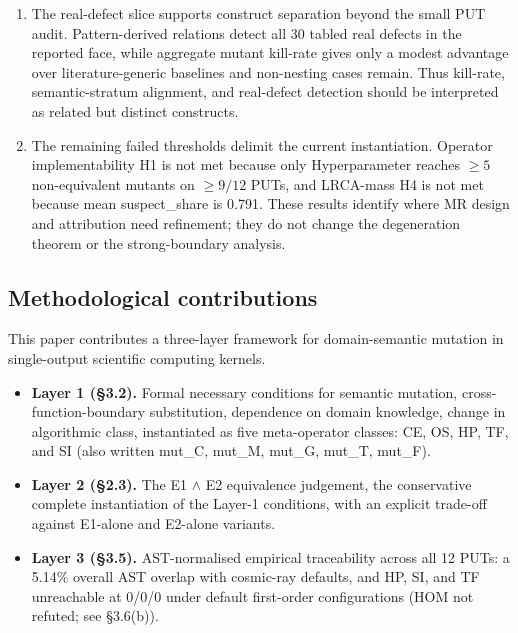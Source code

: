 \documentclass[acmsmall,screen,review]{acmart}
\providecommand{\tightlist}{\setlength{\itemsep}{0pt}\setlength{\parskip}{0pt}}
\begin{document}
\begin{enumerate}
  and Pattern Coverage is 0.163 at \(n = 12\), so orthogonality remains
  a future hypothesis.
\item
  The real-defect slice supports construct separation beyond the small
  PUT audit. Pattern-derived relations detect all 30 tabled real defects
  in the reported face, while aggregate mutant kill-rate gives only a
  modest advantage over literature-generic baselines and non-nesting
  cases remain. Thus kill-rate, semantic-stratum alignment, and
  real-defect detection should be interpreted as related but distinct
  constructs.
\item
  The remaining failed thresholds delimit the current instantiation.
  Operator implementability H1 is not met because only Hyperparameter
  reaches \(\geq 5\) non-equivalent mutants on \(\geq 9/12\) PUTs, and
  LRCA-mass H4 is not met because mean suspect\_share is 0.791. These
  results identify where MR design and attribution need refinement; they
  do not change the degeneration theorem or the strong-boundary
  analysis.
\end{enumerate}

\subsection{Methodological contributions}\label{methodological-contributions}

This paper contributes a three-layer framework for domain-semantic
mutation in single-output scientific computing kernels.

\begin{itemize}
\tightlist
\item
  \textbf{Layer 1 (§3.2).} Formal necessary conditions for semantic
  mutation, cross-function-boundary substitution, dependence on domain
  knowledge, change in algorithmic class, instantiated as five
  meta-operator classes: CE, OS, HP, TF, and SI (also written mut\_C,
  mut\_M, mut\_G, mut\_T, mut\_F).
\item
  \textbf{Layer 2 (§2.3).} The E1 $\wedge$ E2 equivalence judgement, the
  conservative complete instantiation of the Layer-1 conditions, with an
  explicit trade-off against E1-alone and E2-alone variants.
\item
  \textbf{Layer 3 (§3.5).} AST-normalised empirical traceability across
  all 12 PUTs: a 5.14\% overall AST overlap with cosmic-ray defaults,
  and HP, SI, and TF unreachable at 0/0/0 under default first-order
  configurations (HOM not refuted; see §3.6(b)).
\end{itemize}
\end{document}
